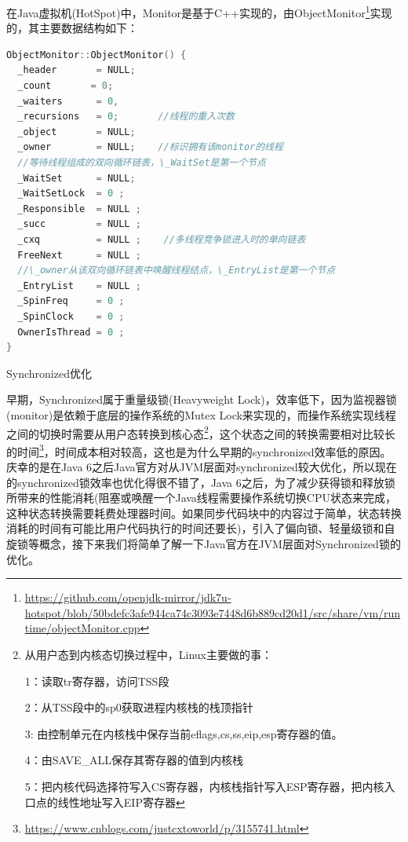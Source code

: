 \documentclass[8pt]{book}
\makeatletter
\numberwithin{dummy}{section}
\theoremstyle{ocrenumbox}
\theoremstyle{blacknumex}
\theoremstyle{blacknumbox}
\theoremstyle{ocrenum}
\renewcommand{\subsubsection}{\@startsection {subsubsection}{3}{\z@}
	{-2ex \@plus -0.1ex \@minus -.2ex}
	{.2ex \@plus.2ex }
	{\normalfont\small\sffamily\bfseries}}
\newlength\esp
\makeatother
\begin{document}
在Java虚拟机(HotSpot)中，Monitor是基于C++实现的，由ObjectMonitor\footnote{\url{https://github.com/openjdk-mirror/jdk7u-hotspot/blob/50bdefc3afe944ca74c3093e7448d6b889cd20d1/src/share/vm/runtime/objectMonitor.cpp}}实现的，其主要数据结构如下：

\begin{lstlisting}[language=C++]
ObjectMonitor::ObjectMonitor() {  
  _header       = NULL;  
  _count       = 0;  
  _waiters      = 0,  
  _recursions   = 0;       //线程的重入次数
  _object       = NULL;  
  _owner        = NULL;    //标识拥有该monitor的线程
  //等待线程组成的双向循环链表，\_WaitSet是第一个节点
  _WaitSet      = NULL;    
  _WaitSetLock  = 0 ;  
  _Responsible  = NULL ;  
  _succ         = NULL ;  
  _cxq          = NULL ;    //多线程竞争锁进入时的单向链表
  FreeNext      = NULL ;
  //\_owner从该双向循环链表中唤醒线程结点，\_EntryList是第一个节点  
  _EntryList    = NULL ;    
  _SpinFreq     = 0 ;  
  _SpinClock    = 0 ;  
  OwnerIsThread = 0 ;  
}
\end{lstlisting}

\subsubsection{Synchronized优化}

早期，Synchronized属于重量级锁(Heavyweight Lock)，效率低下，因为监视器锁(monitor)是依赖于底层的操作系统的Mutex Lock来实现的，而操作系统实现线程之间的切换时需要从用户态转换到核心态\footnote{从用户态到内核态切换过程中，Linux主要做的事：

1：读取tr寄存器，访问TSS段

2：从TSS段中的sp0获取进程内核栈的栈顶指针

3:  由控制单元在内核栈中保存当前eflags,cs,ss,eip,esp寄存器的值。

4：由SAVE\_ALL保存其寄存器的值到内核栈

5：把内核代码选择符写入CS寄存器，内核栈指针写入ESP寄存器，把内核入口点的线性地址写入EIP寄存器}，这个状态之间的转换需要相对比较长的时间\footnote{\url{https://www.cnblogs.com/justcxtoworld/p/3155741.html}}，时间成本相对较高，这也是为什么早期的synchronized效率低的原因。庆幸的是在Java 6之后Java官方对从JVM层面对synchronized较大优化，所以现在的synchronized锁效率也优化得很不错了，Java 6之后，为了减少获得锁和释放锁所带来的性能消耗(阻塞或唤醒一个Java线程需要操作系统切换CPU状态来完成，这种状态转换需要耗费处理器时间。如果同步代码块中的内容过于简单，状态转换消耗的时间有可能比用户代码执行的时间还要长)，引入了偏向锁、轻量级锁和自旋锁等概念，接下来我们将简单了解一下Java官方在JVM层面对Synchronized锁的优化。
\end{document}
